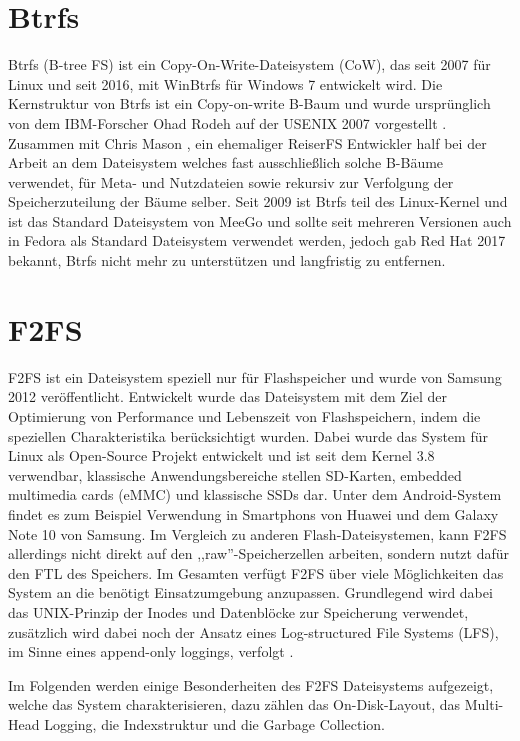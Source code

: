 \documentclass[11pt]{article}
\begin{document}
\section{Btrfs}
\label{Btrfs}
\par{
Btrfs (B-tree FS) ist ein Copy-On-Write-Dateisystem (CoW), das seit 2007 für Linux und seit 2016, mit WinBtrfs für Windows 7 entwickelt wird. Die Kernstruktur von Btrfs ist ein Copy-on-write B-Baum und wurde ursprünglich von dem IBM-Forscher Ohad Rodeh auf der USENIX 2007 vorgestellt \cite{rodeh2008b}. Zusammen mit Chris Mason \cite{mason2007btrfs}, ein ehemaliger ReiserFS Entwickler half bei der Arbeit an dem Dateisystem welches fast ausschließlich solche B-Bäume verwendet, für Meta- und Nutzdateien sowie rekursiv zur Verfolgung der Speicherzuteilung der Bäume selber\cite{rodeh2013btrfs}. Seit 2009 ist Btrfs teil des Linux-Kernel und ist das Standard Dateisystem von MeeGo und sollte seit mehreren Versionen auch in Fedora als Standard Dateisystem verwendet werden, jedoch gab Red Hat 2017 bekannt, Btrfs nicht mehr zu unterstützen und langfristig zu entfernen.
}
\par{

}


\newpage
\section{F2FS}
\label{F2FS}
F2FS ist ein Dateisystem speziell nur für Flashspeicher und wurde von Samsung 2012 veröffentlicht. Entwickelt wurde das Dateisystem mit dem Ziel der Optimierung von Performance und Lebenszeit von Flashspeichern, indem die speziellen Charakteristika berücksichtigt wurden. Dabei wurde das System für Linux als Open-Source Projekt entwickelt und ist seit dem Kernel 3.8 verwendbar, klassische Anwendungsbereiche stellen SD-Karten, embedded multimedia cards (eMMC) und klassische SSDs dar. Unter dem Android-System findet es zum Beispiel Verwendung in Smartphons von Huawei und dem Galaxy Note 10 von Samsung. Im Vergleich zu anderen Flash-Dateisystemen, kann F2FS allerdings nicht direkt auf den ,,raw''-Speicherzellen arbeiten, sondern nutzt dafür den FTL des Speichers. Im Gesamten verfügt F2FS über viele Möglichkeiten das System an die benötigt Einsatzumgebung anzupassen. Grundlegend wird dabei das UNIX-Prinzip der Inodes und Datenblöcke zur Speicherung verwendet, zusätzlich wird dabei noch der Ansatz eines Log-structured File Systems (LFS), im Sinne eines append-only loggings, verfolgt \cite{lee2015f2fs}.

Im Folgenden werden einige Besonderheiten des F2FS Dateisystems aufgezeigt, welche das System charakterisieren, dazu zählen das On-Disk-Layout, das Multi-Head Logging, die Indexstruktur und die Garbage Collection.
\end{document}
